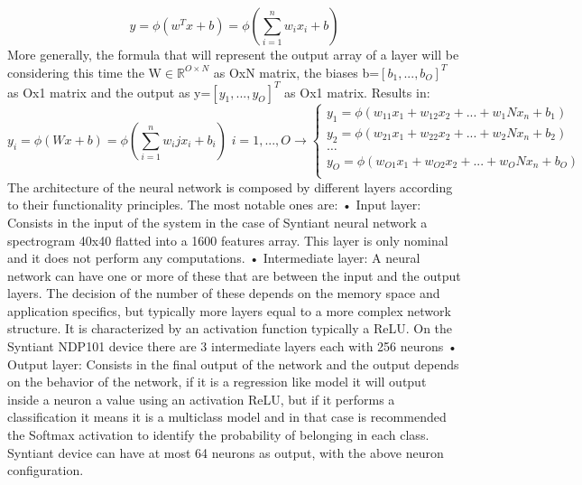 \begin{equation}
    y=\phi(w^Tx+b)=\phi(\sum_{i=1}^{n}w_ix_i+b)
\end{equation}
More generally, the formula that will represent the output array of a layer will be considering this time the W$\in\mathbb{R}^{O\times N}$ as OxN matrix, the biases b=$[b_1,...,b_O]^T$ as Ox1 matrix and the output as y=$[y_1,...,y_O]^T$ as Ox1 matrix. Results in:
\begin{equation}
    y_i=\phi(Wx+b)=\phi(\sum_{i=1}^{n}w_ijx_i+b_i)\,\,i=1,...,O\rightarrow \begin{cases}
        y_1=\phi(w_{11}x_1+w_{12}x_2+...+w_1Nx_n+b_1)\\
        y_2=\phi(w_{21}x_1+w_{22}x_2+...+w_2Nx_n+b_2)\\
        \dots\\
        y_O=\phi(w_{O1}x_1+w_{O2}x_2+...+w_ONx_n+b_O)\\
    \end{cases}
\end{equation}
The architecture of the neural network is composed by different layers according to their functionality principles. The most notable ones are:\newline
• Input layer: Consists in the input of the system in the case of Syntiant neural network a spectrogram 40x40 flatted into a 1600 features array. This layer is only nominal and it does not perform any computations.\newline 
• Intermediate layer: A neural network can have one or more of these that are between the input and the output layers. The decision of the number of these depends on the memory space and application specifics, but typically more layers equal to a more complex network structure. It is characterized by an activation function typically a ReLU. On the Syntiant NDP101 device there are 3 intermediate layers each with 256 neurons\newline
• Output layer: Consists in the final output of the network and the output depends on the behavior of the network, if it is a regression like model it will output inside a neuron a value using an activation ReLU, but if it performs a classification it means it is a multiclass model and in that case is recommended the Softmax activation to identify the probability of belonging in each class. Syntiant device can have at most 64 neurons as output, with the above neuron configuration.\newline

